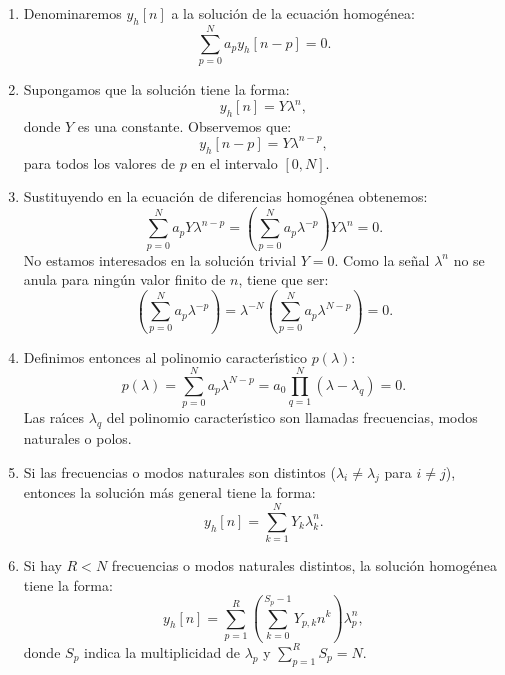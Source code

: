\documentclass[11pt,a4paper,openany]{book}
\begin{document}
\begin{enumerate}
	\item Denominaremos $y_{h}[n]$ a la soluci\'{o}n de la ecuaci\'{o}n homog\'{e}nea:
	\begin{equation}
		\sum_{p=0}^{N}a_{p} y_{h}[n-p] = 0.
	\end{equation}
	
	\item Supongamos que la soluci\'{o}n tiene la forma:
	\begin{equation}
		y_{h}[n] = Y \lambda^n,
	\end{equation}
	donde $Y$ es una constante. Observemos que:
	\begin{equation}
		y_{h}[n-p] = Y \lambda^{n-p},
	\end{equation}
	para todos los valores de $p$ en el intervalo $[0,N]$.
	
	\item Sustituyendo en la ecuaci\'{o}n de diferencias homog\'{e}nea obtenemos:
	\begin{equation}
		\sum_{p=0}^{N}a_{p} Y \lambda^{n-p} = \left( \sum_{p=0}^{N}a_{p} \lambda^{-p} \right) Y \lambda^{n} = 0.
	\end{equation}
	No estamos interesados en la soluci\'{o}n trivial $Y=0$. Como la se\~{n}al $\lambda^{n}$ no se anula para ning\'{u}n valor finito de $n$, tiene que ser:
	\begin{equation}
		\left( \sum_{p=0}^{N}a_{p} \lambda^{-p} \right) = \lambda^{-N} \left( \sum_{p=0}^{N}a_{p} \lambda^{N-p} \right) = 0.
	\end{equation}
	
	\item Definimos entonces al polinomio caracter\'{\i}stico $p(\lambda)$:
	\begin{equation}
		p(\lambda) = \sum_{p=0}^{N}a_{p} \lambda^{N-p} = a_{0} \prod_{q=1}^{N} ( \lambda - \lambda_{q} ) = 0.
	\end{equation}
	Las ra\'{\i}ces $\lambda_{q}$ del polinomio caracter\'{\i}stico son llamadas frecuencias, modos naturales o polos.
	
	\item Si las frecuencias o modos naturales son distintos ($\lambda_i \neq \lambda_j$ para $i \neq j$), entonces la soluci\'{o}n m\'{a}s general tiene la forma:
	\begin{equation}
		y_{h}[n] = \sum_{k=1}^{N} Y_{k} \lambda_{k}^n.
	\end{equation}
	
	\item Si hay $R<N$ frecuencias o modos naturales distintos, la soluci\'{o}n homog\'{e}nea tiene la forma:
	\begin{equation}
		y_{h}[n] = \sum_{p=1}^{R} \left(\sum_{k=0}^{S_{p}-1} Y_{p,k} n^{k} \right) \lambda_{p}^n,
	\end{equation}
	donde $S_{p}$ indica la multiplicidad de $\lambda_{p}$ y $\sum_{p=1}^{R}S_{p} = N$.
\end{enumerate}
\end{document}

